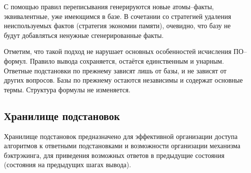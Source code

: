 С помощью правил переписывания генерируются новые атомы--факты, эквивалентные, уже имеющимся в базе. В сочетании со стратегией удаления неиспользуемых фактов (стратегия экономии памяти), очевидно, что базу не будут добавляться ненужные сгенерированные факты.

Отметим, что такой подход не нарушает основных особенностей исчисления ПО--формул. Правило вывода сохраняется, остаётся единственным и унарным. Ответные подстановки по прежнему зависят лишь от базы, и не зависят от других вопросов. Базы по прежнему остаются независимы и содержат основные термы. Структура формулы не изменяется.






\subsection{Хранилище подстановок}
Хранилище подстановок предназначено для эффективной организации доступа алгоритмов к ответными подстановками и возможности организации механизма бэктрэкинга, для приведения возможных ответов в предыдущие состояния (состояния на предыдущих шагах вывода).

